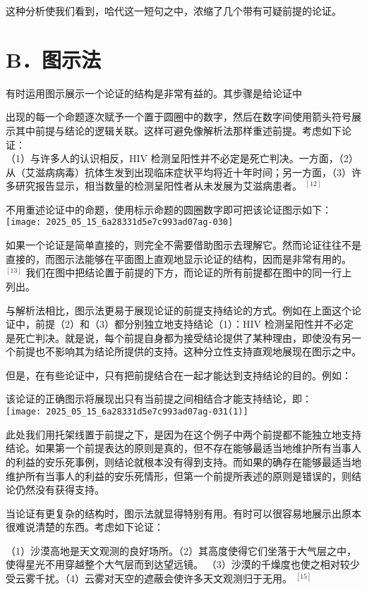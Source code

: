 这种分析使我们看到，哈代这一短句之中，浓缩了几个带有可疑前提的论证。

\section*{B．图示法}
有时运用图示展示一个论证的结构是非常有益的。其步骤是给论证中

出现的每一个命题逐次赋予一个置于圆圈中的数字，然后在数字间使用箭头符号展示其中前提与结论的逻辑关联。这样可避免像解析法那样重述前提。考虑如下论证：\\
（1）与许多人的认识相反，HIV 检测呈阳性并不必定是死亡判决。一方面，（2）从（艾滋病病毒）抗体生发到出现临床症状平均将近十年时间；另一方面，（3）许多研究报告显示，相当数量的检测呈阳性者从未发展为艾滋病患者。 ${ }^{[12]}$

不用重述论证中的命题，使用标示命题的圆圈数字即可把该论证图示如下：\\
\texttt{[image: 2025\_05\_15\_6a28331d5e7c993ad07ag-030]}

如果一个论证是简单直接的，则完全不需要借助图示去理解它。然而论证往往不是直接的，而图示法能够在平面图上直观地显示论证的结构，因而是非常有用的。 ${ }^{[13]}$ 我们在图中把结论置于前提的下方，而论证的所有前提都在图中的同一行上列出。

与解析法相比，图示法更易于展现论证的前提支持结论的方式。例如在上面这个论证中，前提（2）和（3）都分别独立地支持结论（1）：HIV 检测呈阳性并不必定是死亡判决。就是说，每个前提自身都为接受结论提供了某种理由，即使没有另一个前提也不影响其为结论所提供的支持。这种分立性支持直观地展现在图示之中。

但是，在有些论证中，只有把前提结合在一起才能达到支持结论的目的。例如：

该论证的正确图示将展现出只有当前提之间相结合才能支持结论，即：\\
\texttt{[image: 2025\_05\_15\_6a28331d5e7c993ad07ag-031(1)]}

此处我们用托架线置于前提之下，是因为在这个例子中两个前提都不能独立地支持结论。如果第一个前提表达的原则是真的，但不存在能够最适当地维护所有当事人的利益的安乐死事例，则结论就根本没有得到支持。而如果的确存在能够最适当地维护所有当事人的利益的安乐死情形，但第一个前提所表述的原则是错误的，则结论仍然没有获得支持。

当论证有更复杂的结构时，图示法就显得特别有用。有时可以很容易地展示出原本很难说清楚的东西。考虑如下论证：

\begin{displayquote}
（1）沙漠高地是天文观测的良好场所。（2）其高度使得它们坐落于大气层之中，使得星光不用穿越整个大气层而到达望远镜。 （3）沙漠的千燥度也使之相对较少受云雾千扰。（4）云雾对天空的遮蔽会使许多天文观测归于无用。 ${ }^{[15]}$
\end{displayquote}

